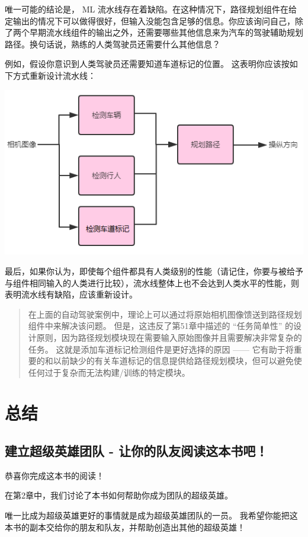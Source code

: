 唯一可能的结论是， ML
流水线存在着缺陷。在这种情况下，路径规划组件在给定输出的情况下可以做得很好，但输入没能包含足够的信息。你应该询问自己，除了两个早期流水线组件的输出之外，还需要哪些其他信息来为汽车的驾驶辅助规划路径。换句话说，熟练的人类驾驶员还需要什么其他信息？

例如，假设你意识到人类驾驶员还需要知道车道标记的位置。
这表明你应该按如下方式重新设计流水线：

\includegraphics{./img/ch57_01.png}

最后，如果你认为，即使每个组件都具有人类级别的性能（请记住，你要与被给予与组件相同输入的人类进行比较），流水线整体上也不会达到人类水平的性能，则表明流水线有缺陷，应该重新设计。

\begin{quote}
在上面的自动驾驶案例中，理论上可以通过将原始相机图像馈送到路径规划组件中来解决该问题。
但是，这违反了第51章中描述的 ``任务简单性''
的设计原则，因为路径规划模块现在需要输入原始图像并且需要解决非常复杂的任务。
这就是添加车道标记检测组件是更好选择的原因 ------
它有助于将重要的和以前缺少的有关车道标记的信息提供给路径规划模块，但可以避免使任何过于复杂而无法构建/训练的特定模块。
\end{quote}

\hypertarget{ux603bux7ed3}{%
\part{总结}\label{ux603bux7ed3}}

\hypertarget{ux5efaux7acbux8d85ux7ea7ux82f1ux96c4ux56e2ux961f---ux8ba9ux4f60ux7684ux961fux53cbux9605ux8bfbux8fd9ux672cux4e66ux5427}{%
\chapter{建立超级英雄团队 -
让你的队友阅读这本书吧！}\label{ux5efaux7acbux8d85ux7ea7ux82f1ux96c4ux56e2ux961f---ux8ba9ux4f60ux7684ux961fux53cbux9605ux8bfbux8fd9ux672cux4e66ux5427}}

恭喜你完成这本书的阅读！

在第2章中，我们讨论了本书如何帮助你成为团队的超级英雄。

唯一比成为超级英雄更好的事情就是成为超级英雄团队的一员。
我希望你能把这本书的副本交给你的朋友和队友，并帮助创造出其他的超级英雄！
